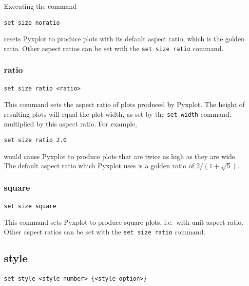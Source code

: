 Executing the command

\begin{verbatim}
set size noratio
\end{verbatim}

\noindent resets Pyxplot to produce plots with its default aspect ratio, which
is the golden ratio. Other aspect ratios can be set with the {\tt set size
ratio} command.


\subsubsection{ratio}

\begin{verbatim}
set size ratio <ratio>
\end{verbatim}

This command sets the aspect ratio of plots produced by Pyxplot.  The height of
resulting plots will equal the plot width, as set by the {\tt set width}
command, multiplied by this aspect ratio.  For example,

\begin{verbatim}
set size ratio 2.0
\end{verbatim}

\noindent would cause Pyxplot to produce plots that are twice as high as they
are wide.  The default aspect ratio which Pyxplot uses is a golden ratio of
$2/(1+\sqrt{5})$.


\subsubsection{square}

\begin{verbatim}
set size square
\end{verbatim}

This command sets Pyxplot to produce square plots, i.e.\ with unit aspect
ratio. Other aspect ratios can be set with the {\tt set size ratio} command.


\subsection{style}

\begin{verbatim}
set style <style number> {<style option>}
\end{verbatim}

